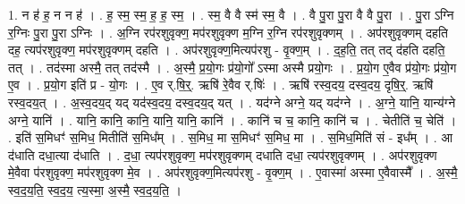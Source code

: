 \documentclass[17pt]{extarticle}
\begin{document}
1. न ह॑ ह॒ न न ह॑ । . ह॒ स्म॒ स्म॒ ह॒ ह॒ स्म॒ । . स्म॒ वै वै स्म॑ स्म॒ वै । . वै पु॒रा पु॒रा वै वै पु॒रा । . पु॒रा ऽग्नि र॒ग्निः पु॒रा पु॒रा ऽग्निः । . अ॒ग्नि रप॑रशुवृक्ण॒ मप॑रशुवृक्ण म॒ग्नि र॒ग्नि रप॑रशुवृक्णम् । . अप॑रशुवृक्णम् दहति दह॒ त्यप॑रशुवृक्ण॒ मप॑रशुवृक्णम् दहति । . अप॑रशुवृक्ण॒मित्यप॑रशु - वृ॒क्ण॒म् । . द॒ह॒ति॒ तत् तद् द॑हति दहति॒ तत् । . तद॑स्मा अस्मै॒ तत् तद॑स्मै । . अ॒स्मै॒ प्र॒यो॒गः प्र॑यो॒गो᳚ ऽस्मा अस्मै प्रयो॒गः । . प्र॒यो॒ग ए॒वैव प्र॑यो॒गः प्र॑यो॒ग ए॒व । . प्र॒यो॒ग इति॑ प्र - यो॒गः । . ए॒व र्.षि॒र्॒. ऋषि॑ रे॒वैव र्.षिः॑ । . ऋषि॑ रस्व॒दय॒ दस्व॒दय॒ दृषि॒र्॒. ऋषि॑ रस्व॒दय॒त् । . अ॒स्व॒दय॒द् यद् यद॑स्व॒दय॒ दस्व॒दय॒द् यत् । . यद॑ग्ने अग्ने॒ यद् यद॑ग्ने । . अ॒ग्ने॒ यानि॒ यान्य॑ग्ने अग्ने॒ यानि॑ । . यानि॒ कानि॒ कानि॒ यानि॒ यानि॒ कानि॑ । . कानि॑ च च॒ कानि॒ कानि॑ च । . चेतीति॑ च॒ चेति॑ । . इति॑ स॒मिधꣳ॑ स॒मिध॒ मितीति॑ स॒मिध᳚म् । . स॒मिध॒ मा स॒मिधꣳ॑ स॒मिध॒ मा । . स॒मिध॒मिति॑ सं - इध᳚म् । . आ द॑धाति दधा॒त्या द॑धाति । . द॒धा॒ त्यप॑रशुवृक्ण॒ मप॑रशुवृक्णम् दधाति दधा॒ त्यप॑रशुवृक्णम् । . अप॑रशुवृक्ण मे॒वैवा प॑रशुवृक्ण॒ मप॑रशुवृक्ण मे॒व । . अप॑रशुवृक्ण॒मित्यप॑रशु - वृ॒क्ण॒म् । . ए॒वास्मा॑ अस्मा ए॒वैवास्मै᳚ । . अ॒स्मै॒ स्व॒द॒य॒ति॒ स्व॒द॒य॒ त्य॒स्मा॒ अ॒स्मै॒ स्व॒द॒य॒ति॒ । \newline
\end{document}
